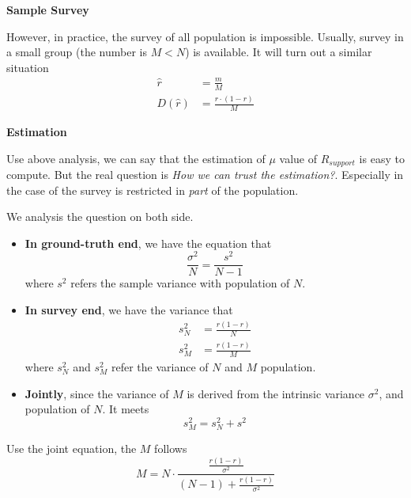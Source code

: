 \documentclass[../main.tex]{subfiles}
\begin{document}
\bigbreak
\textbf{Sample Survey}

However, in practice, the survey of all population is impossible.
Usually, survey in a small group (the number is $M < N$) is available.
It will turn out a similar situation
\begin{align}
    \hat{r}    & = \frac{m}{M}             \\
    D(\hat{r}) & = \frac{r \cdot (1-r)}{M}
\end{align}

\bigbreak
\textbf{Estimation}

Use above analysis, we can say that the estimation of $\mu$ value of $R_{support}$ is easy to compute.
But the real question is \emph{How we can trust the estimation?}.
Especially in the case of the survey is restricted in \emph{part} of the population.

We analysis the question on both side.

\begin{itemize}
    \item \textbf{In ground-truth end}, we have the equation that
          \begin{equation*}
              \frac{\sigma^2}{N} = \frac{s^2}{N-1}
          \end{equation*}
          where $s^2$ refers the sample variance with population of $N$.
    \item \textbf{In survey end}, we have the variance that
          \begin{align*}
              s_{N}^2 & = \frac{r(1-r)}{N} \\
              s_{M}^2 & = \frac{r(1-r)}{M}
          \end{align*}
          where $s_N^2$ and $s_M^2$ refer the variance of $N$ and $M$ population.

    \item \textbf{Jointly}, since the variance of $M$ is derived from the intrinsic variance $\sigma^2$, and population of $N$.
          It meets
          \begin{equation*}
              s_M^2 = s_N^2 + s^2
          \end{equation*}

\end{itemize}

Use the joint equation, the $M$ follows
\begin{equation*}
    M = N \cdot \frac{\frac{r(1-r)}{\sigma^2}}{(N-1)+\frac{r(1-r)}{\sigma^2}}
\end{equation*}
\end{document}
